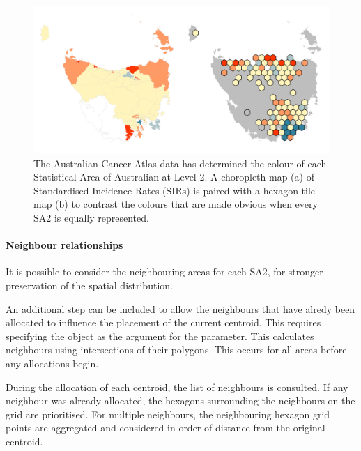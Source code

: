 \documentclass[
]{jss}
\begin{document}
\begin{CodeChunk}
\begin{figure}

{\centering \includegraphics[width=1\linewidth]{figures/7SIR} 

}

\caption[The Australian Cancer Atlas data has determined the colour of each Statistical Area of Australian at Level 2]{The Australian Cancer Atlas data has determined the colour of each Statistical Area of Australian at Level 2. A choropleth map (a) of Standardised Incidence Rates (SIRs) is paired with a hexagon tile map (b) to contrast the colours that are made obvious when every SA2 is equally represented.}\label{fig:sir}
\end{figure}
\end{CodeChunk}

\hypertarget{neighbour-relationships}{%
\paragraph{Neighbour relationships}\label{neighbour-relationships}}

It is possible to consider the neighbouring areas for each SA2, for
stronger preservation of the spatial distribution.

An additional step can be included to allow the neighbours that have
alredy been allocated to influence the placement of the current
centroid. This requires specifying the  object as the argument
for the  parameter. This calculates neighbours
using intersections of their polygons. This occurs for all areas before
any allocations begin.

During the allocation of each centroid, the list of neighbours is
consulted. If any neighbour was already allocated, the hexagons
surrounding the neighbours on the grid are prioritised. For multiple
neighbours, the neighbouring hexagon grid points are aggregated and
considered in order of distance from the original centroid.
\end{document}
